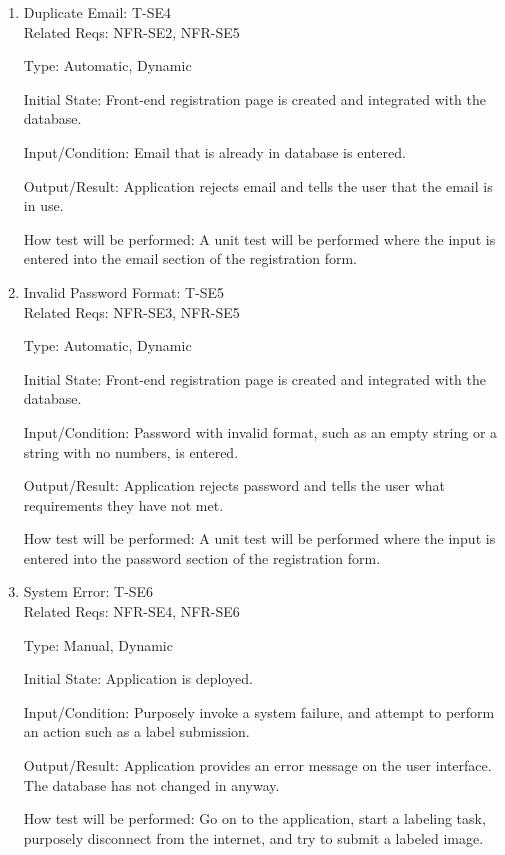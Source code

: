 \documentclass[12pt, titlepage]{article}
\begin{document}
\begin{enumerate}
\item{Duplicate Email: T-SE4\\}
Related Reqs: NFR-SE2, NFR-SE5

Type: Automatic, Dynamic
					
Initial State: Front-end registration page is created and integrated with the database.
					
Input/Condition: Email that is already in database is entered.
					
Output/Result: Application rejects email and tells the user that the email is in use.
					
How test will be performed: A unit test will be performed where the input is entered into the email section of the registration form.

\item{Invalid Password Format: T-SE5\\}
Related Reqs: NFR-SE3, NFR-SE5

Type: Automatic, Dynamic
					
Initial State: Front-end registration page is created and integrated with the database.
					
Input/Condition: Password with invalid format, such as an empty string or a string with no numbers, is entered.
					
Output/Result: Application rejects password and tells the user what requirements they have not met.
					
How test will be performed: A unit test will be performed where the input is entered into the password section of the registration form.

\item{System Error: T-SE6\\}
Related Reqs: NFR-SE4, NFR-SE6

Type: Manual, Dynamic
					
Initial State: Application is deployed.
					
Input/Condition: Purposely invoke a system failure, and attempt to perform an action such as a label submission.
					
Output/Result: Application provides an error message on the user interface. The database has not changed in anyway.
					
How test will be performed: Go on to the application, start a labeling task, purposely disconnect from the internet, and try to submit a labeled image.

\end{enumerate}
\end{document}
